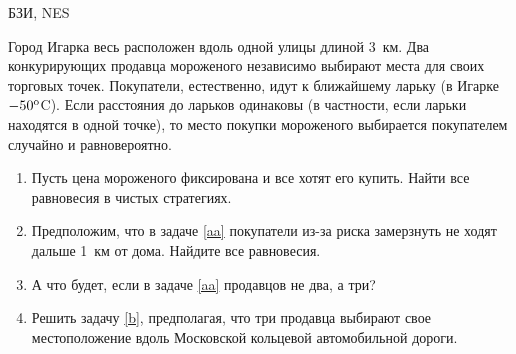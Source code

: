 \begin{problem}
\begin{source}
БЗИ, NES
\end{source} Город Игарка весь
расположен вдоль одной улицы длиной 3~км. Два конкурирующих
продавца мороженого независимо выбирают места для своих
торговых точек. Покупатели, естественно, идут к ближайшему
ларьку (в Игарке $-50^{\rm o}$C). Если расстояния до
ларьков одинаковы (в частности, если ларьки находятся в
одной точке), то место покупки мороженого выбирается
покупателем случайно и равновероятно.

\begin{enumerate}

\item\label{aa} Пусть цена мороженого фиксирована и все
хотят его купить. Найти все равновесия в чистых стратегиях.

\item Предположим, что в задаче \ref{aa} покупатели из-за
риска замерзнуть не ходят дальше 1~км от дома. Найдите все
равновесия.

\item\label{b} А что будет, если в задаче \ref{aa}
продавцов не два, а три?

\item Решить задачу \ref{b}, предполагая, что три продавца
выбирают свое местоположение вдоль Московской кольцевой
автомобильной дороги.

\end{enumerate}

\begin{sol}

\end{sol}
\end{problem}





